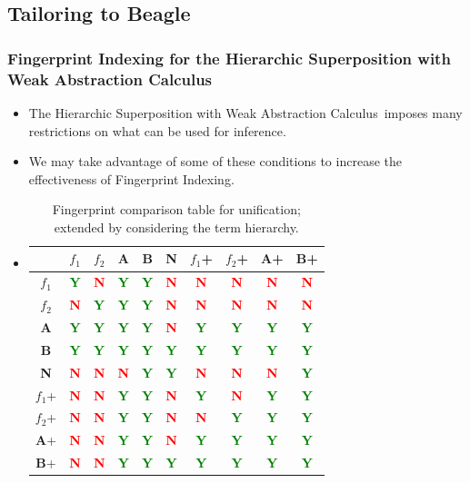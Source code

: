 \documentclass[10pt,xcolor={dvipsnames}]{beamer}
\newcommand{\HSWAC}{Hierarchic Superposition with Weak Abstraction Calculus}
\newcommand{\compY}{\textcolor{Green}{\textbf{Y}}}
\newcommand{\compN}{\textcolor{Red}{\textbf{N}}}
\begin{document}
\begin{NoHyper}
\subsection{Tailoring to Beagle}
\begin{frame}
  \frametitle{Fingerprint Indexing for the Hierarchic Superposition with Weak Abstraction Calculus}
  \begin{itemize}
  \item<1-> The \HSWAC\ imposes many restrictions on what can be used for inference.
  \item<2-> We may take advantage of some of these conditions to increase the effectiveness of Fingerprint Indexing.
  \item<3->[]\begin{table}[H]\scriptsize
  \caption{Fingerprint comparison table for unification; extended by considering the term hierarchy.}
  \label{tab:extunif}
  \begin{tabular}{| c || c | c | c | c | c || c | c | c | c |}
  \hline
            &  $f_1$  &  $f_2$  &  \textbf{A} &  \textbf{B} &  \textbf{N} &    $f_1$+  & $f_2$+  & \textbf{A}+ & \textbf{B}+ \\ \hline \hline
  $f_1$     &  \compY &  \compN &  \compY     &  \compY     &  \compN     &    \compN  & \compN  & \compN      & \compN      \\ 
  $f_2$     &  \compN &  \compY &  \compY     &  \compY     &  \compN     &    \compN  & \compN  & \compN      & \compN      \\ 
\textbf{A}  &  \compY &  \compY &  \compY     &  \compY     &  \compN     &    \compY  & \compY  & \compY      & \compY      \\
\textbf{B}  &  \compY &  \compY &  \compY     &  \compY     &  \compY     &    \compY  & \compY  & \compY      & \compY      \\ 
\textbf{N}  &  \compN &  \compN &  \compN     &  \compY     &  \compY     &    \compN  & \compN  & \compN      & \compY      \\ \hline \hline
%
$f_1$+      &  \compN &  \compN &  \compY     &  \compY     &  \compN     &    \compY  & \compN  & \compY      & \compY      \\ 
$f_2$+      &  \compN &  \compN &  \compY     &  \compY     &  \compN     &    \compN  & \compY  & \compY      & \compY      \\ 
\textbf{A}+ &  \compN &  \compN &  \compY     &  \compY     &  \compN     &    \compY  & \compY  & \compY      & \compY      \\
\textbf{B}+ &  \compN &  \compN &  \compY     &  \compY     &  \compY     &    \compY  & \compY  & \compY      & \compY      \\ \hline
  \end{tabular}\end{table}
  \end{itemize}


\end{frame}
\end{NoHyper}
\end{document}
